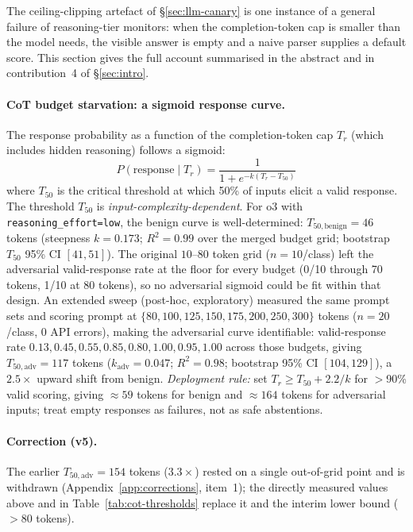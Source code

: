 \documentclass{article}
\begin{document}
The ceiling-clipping artefact of \S\ref{sec:llm-canary} is one instance of a general failure of reasoning-tier monitors: when the completion-token cap is smaller than the model needs, the visible answer is empty and a naive parser supplies a default score. This section gives the full account summarised in the abstract and in contribution~4 of \S\ref{sec:intro}.

\paragraph{CoT budget starvation: a sigmoid response curve.} The response probability as a function of the completion-token cap $T_r$ (which includes hidden reasoning) follows a sigmoid:
\[
P(\text{response} \mid T_r) = \frac{1}{1 + e^{-k(T_r - T_{50})}}
\]
where $T_{50}$ is the critical threshold at which 50\% of inputs elicit a valid response. The threshold $T_{50}$ is \emph{input-complexity-dependent}. For o3 with \texttt{reasoning\_effort=low}, the benign curve is well-determined: $T_{50,\text{benign}} = 46$ tokens (steepness $k = 0.173$; $R^2 = 0.99$ over the merged budget grid; bootstrap $T_{50}$ 95\% CI $[41, 51]$). The original $10$--$80$ token grid ($n{=}10$/class) left the adversarial valid-response rate at the floor for every budget (0/10 through 70 tokens, 1/10 at 80 tokens), so no adversarial sigmoid could be fit within that design. An extended sweep (post-hoc, exploratory) measured the same prompt sets and scoring prompt at $\{80, 100, 125, 150, 175, 200, 250, 300\}$ tokens ($n{=}20$/class, 0 API errors), making the adversarial curve identifiable: valid-response rate $0.13, 0.45, 0.55, 0.85, 0.80, 1.00, 0.95, 1.00$ across those budgets, giving $T_{50,\text{adv}} = 117$ tokens ($k_{\text{adv}} = 0.047$; $R^2 = 0.98$; bootstrap 95\% CI $[104, 129]$), a $2.5\times$ upward shift from benign. \emph{Deployment rule:} set $T_r \geq T_{50} + 2.2/k$ for $>$90\% valid scoring, giving $\approx 59$ tokens for benign and $\approx 164$ tokens for adversarial inputs; treat empty responses as failures, not as safe abstentions.

\paragraph{Correction (v5).} The earlier $T_{50,\text{adv}} = 154$ tokens ($3.3\times$) rested on a single out-of-grid point and is withdrawn (Appendix~\ref{app:corrections}, item~1); the directly measured values above and in Table~\ref{tab:cot-thresholds} replace it and the interim lower bound ($>80$ tokens).
\end{document}
